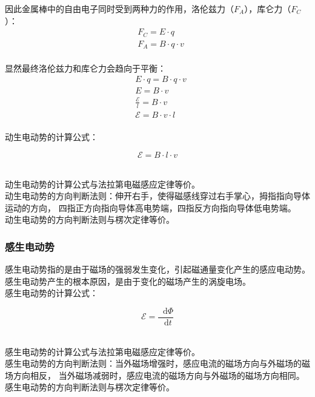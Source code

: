 \documentclass[UTF8]{ctexart}
\newcommand*{\dif}{\mathop{}\!\mathrm{d}}
\begin{document}
\newpage

    因此金属棒中的自由电子同时受到两种力的作用，洛伦兹力（$F_A$），库仑力（$F_C$）：\vspace{5pt}
    \setcounter{equation}{0}
    \begin{align}
        &F_C=E\cdot q\\[3mm]
        &F_A=B\cdot q\cdot v
    \end{align}\\
    显然最终洛伦兹力和库仑力会趋向于平衡：\vspace{3pt}
    \begin{align}
        &E\cdot q=B\cdot q\cdot v\\[4mm]
        &E=B\cdot v\\[4mm]
        &\frac{\mathscr{E}}{l}=B\cdot v\\[4mm]
        &\mathscr{E}=B\cdot v\cdot l
    \end{align}\\
    动生电动势的计算公式：
    \begin{large}
        \begin{equation*}
            \mathscr{E}=B\cdot l\cdot v
        \end{equation*}
    \end{large}\\
    动生电动势的计算公式与法拉第电磁感应定律等价。\\[6mm]
    动生电动势的方向判断法则：伸开右手，使得磁感线穿过右手掌心，拇指指向导体运动的方向，
    四指正方向指向导体高电势端，四指反方向指向导体低电势端。\\[2mm]
    动生电动势的方向判断法则与楞次定律等价。

\subsubsection{感生电动势}
    感生电动势指的是由于磁场的强弱发生变化，引起磁通量变化产生的感应电动势。\\[3mm]
    感生电动势产生的根本原因，是由于变化的磁场产生的涡旋电场。\\[3mm]
    感生电动势的计算公式：
    \begin{large}
        \begin{equation*}
            \mathscr{E}=\frac{\dif\Phi}{\dif t}
        \end{equation*}
    \end{large}\\
    感生电动势的计算公式与法拉第电磁感应定律等价。\\[6mm]
    感生电动势的方向判断法则：当外磁场增强时，感应电流的磁场方向与外磁场的磁场方向相反，
    当外磁场减弱时，感应电流的磁场方向与外磁场的磁场方向相同。\\[2mm]
    感生电动势的方向判断法则与楞次定律等价。
\end{document}

